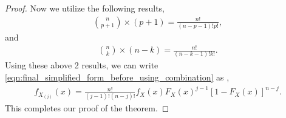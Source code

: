 \documentclass[a4paper,english,12pt]{article}
\begin{document}
\begin{proof}
Now we utilize the following results,
\begin{align}
\binom{n}{p+1}\times (p+1)=\frac{n!}{(n-p-1)!p!}, \nonumber 
\end{align}
and
\begin{align}
\binom{n}{k}\times (n-k)=\frac{n!}{(n-k-1)!k!}. \nonumber 
\end{align}
Using these above 2 results, we can write \eqref{eqn:final_simplified_form_before_using_combination} as ,
\begin{align}
f_{X_{(j)}} (x)=\frac{n!}{(j-1)!(n-j)!} f_X (x) F_X (x) ^{j-1} [1 - F_X (x)]^{n-j}.
\end{align}
This completes our proof of the theorem.
\end{proof}
\end{document}
